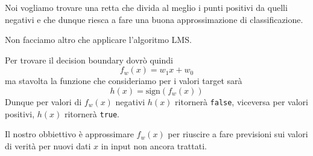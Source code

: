 Noi vogliamo trovare una retta che divida al meglio i punti positivi da quelli negativi e che dunque riesca a fare una
buona approssimazione di classificazione.

Non facciamo altro che applicare l'algoritmo LMS.

Per trovare il decision boundary dovr\`o quindi
\[ f_w(x) = w_1 x + w_0 \]
ma stavolta la funzione che consideriamo per i valori target sar\`a
\[ h(x) = \text{sign}(f_w(x)) \]
Dunque per valori di $f_w(x)$ negativi $h(x)$ ritorner\`a \verb|false|, viceversa per valori positivi, $h(x)$
ritorner\`a \verb|true|.

Il nostro obbiettivo \`e approssimare $f_w(x)$ per riuscire a fare previsioni sui valori di verit\`a per nuovi dati
$x$ in input non ancora trattati.
